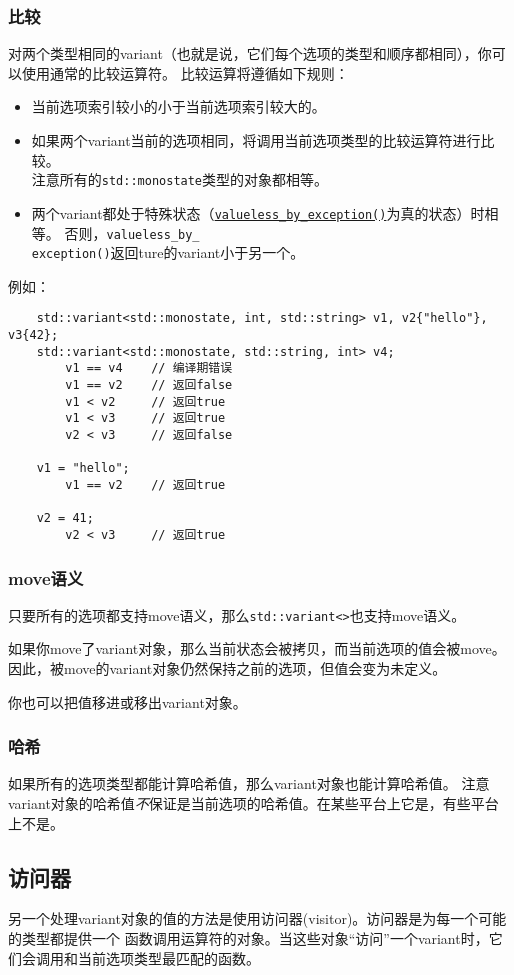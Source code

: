 \subsubsection{比较}
对两个类型相同的variant（也就是说，它们每个选项的类型和顺序都相同），你可以使用通常的比较运算符。
比较运算将遵循如下规则：
\begin{itemize}
    \item 当前选项索引较小的小于当前选项索引较大的。
    \item 如果两个variant当前的选项相同，将调用当前选项类型的比较运算符进行比较。\\
    注意所有的\texttt{std::monostate}类型的对象都相等。
    \item 两个variant都处于特殊状态（\hyperref[ch16.3.4]{\texttt{valueless\_by\_exception()}}为真的状态）时相等。
    否则，\texttt{valueless\_by\_\\
    exception()}返回ture的variant小于另一个。
\end{itemize}
例如：
\begin{lstlisting}
    std::variant<std::monostate, int, std::string> v1, v2{"hello"}, v3{42};
    std::variant<std::monostate, std::string, int> v4;
        v1 == v4    // 编译期错误
        v1 == v2    // 返回false
        v1 < v2     // 返回true
        v1 < v3     // 返回true
        v2 < v3     // 返回false

    v1 = "hello";
        v1 == v2    // 返回true

    v2 = 41;
        v2 < v3     // 返回true
\end{lstlisting}

\subsubsection{move语义}
只要所有的选项都支持move语义，那么\texttt{std::variant<>}也支持move语义。

如果你move了variant对象，那么当前状态会被拷贝，而当前选项的值会被move。
因此，被move的variant对象仍然保持之前的选项，但值会变为未定义。

你也可以把值移进或移出variant对象。

\subsubsection{哈希}
如果所有的选项类型都能计算哈希值，那么variant对象也能计算哈希值。
注意variant对象的哈希值\emph{不}保证是当前选项的哈希值。在某些平台上它是，有些平台上不是。

\subsection{访问器}\label{ch16.3.3}
另一个处理variant对象的值的方法是使用访问器(visitor)。访问器是为每一个可能的类型都提供一个
函数调用运算符的对象。当这些对象“访问”一个variant时，它们会调用和当前选项类型最匹配的函数。

